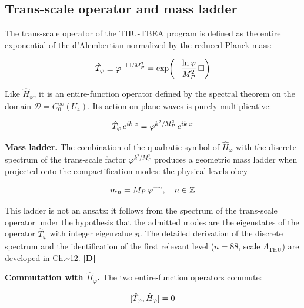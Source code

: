 ﻿\documentclass[11pt,letterpaper]{article}
\begin{document}
\subsection{Trans-scale operator and mass ladder}
The trans-scale operator of the THU-TBEA program is defined as the entire exponential of the d'Alembertian normalized by the reduced Planck mass:

\begin{equation*}
  \resizebox{\ifdim\width>\linewidth \linewidth\else\width\fi}{!}{$\displaystyle \hat{T}_\varphi \equiv \varphi^{-\Box/M_P^2} = \exp\!\left(-\frac{\ln\varphi}{M_P^2}\,\Box\right)$}
\end{equation*}

Like $\hat{H}_\varphi$, it is an entire-function operator defined by the spectral theorem on the domain $\mathcal{D} = C_0^\infty(U_4)$. Its action on plane waves is purely multiplicative:

\begin{equation*}
  \resizebox{\ifdim\width>\linewidth \linewidth\else\width\fi}{!}{$\displaystyle \hat{T}_\varphi\, e^{ik\cdot x} = \varphi^{k^2/M_P^2}\, e^{ik\cdot x}$}
\end{equation*}

\textbf{Mass ladder.} The combination of the quadratic symbol of $\hat{H}_\varphi$ with the discrete spectrum of the trans-scale factor $\varphi^{k^2/M_P^2}$ produces a geometric mass ladder when projected onto the compactification modes: the physical levels obey

\begin{equation*}
  \resizebox{\ifdim\width>\linewidth \linewidth\else\width\fi}{!}{$\displaystyle m_n = M_P\,\varphi^{-n}, \quad n \in \mathbb{Z}$}
\end{equation*}

This ladder is not an ansatz: it follows from the spectrum of the trans-scale operator under the hypothesis that the admitted modes are the eigenstates of the operator $\hat{T}_\varphi$ with integer eigenvalue $n$. The detailed derivation of the discrete spectrum and the identification of the first relevant level ($n = 88$, scale $\Lambda_{\mathrm{THU}}$) are developed in Ch.\textasciitilde{}12. \textbf{[D]}

\textbf{Commutation with $\hat{H}_\varphi$.} The two entire-function operators commute:

\begin{equation*}
  \resizebox{\ifdim\width>\linewidth \linewidth\else\width\fi}{!}{$\displaystyle [\hat{T}_\varphi, \hat{H}_\varphi] = 0$}
\end{equation*}
\end{document}
